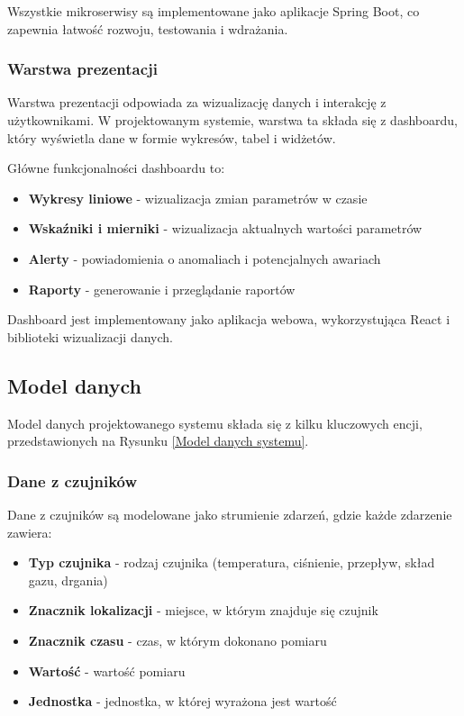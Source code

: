 Wszystkie mikroserwisy są implementowane jako aplikacje Spring Boot, co zapewnia łatwość rozwoju, testowania i wdrażania.

\subsubsection{Warstwa prezentacji}
\label{subsubsec:warstwa_prezentacji}

Warstwa prezentacji odpowiada za wizualizację danych i interakcję z użytkownikami.
W projektowanym systemie, warstwa ta składa się z dashboardu, który wyświetla dane w formie wykresów, tabel i widżetów.

Główne funkcjonalności dashboardu to:

\begin{itemize}
    \item \textbf{Wykresy liniowe} - wizualizacja zmian parametrów w czasie
    \item \textbf{Wskaźniki i mierniki} - wizualizacja aktualnych wartości parametrów
    \item \textbf{Alerty} - powiadomienia o anomaliach i potencjalnych awariach
    \item \textbf{Raporty} - generowanie i przeglądanie raportów
\end{itemize}

Dashboard jest implementowany jako aplikacja webowa, wykorzystująca React i biblioteki wizualizacji danych.

\subsection{Model danych}
\label{subsec:model_danych}

Model danych projektowanego systemu składa się z kilku kluczowych encji, przedstawionych na Rysunku \ref{Model danych systemu}.


\subsubsection{Dane z czujników}
\label{subsubsec:dane_czujnikow}

Dane z czujników są modelowane jako strumienie zdarzeń, gdzie każde zdarzenie zawiera:

\begin{itemize}
    \item \textbf{Typ czujnika} - rodzaj czujnika (temperatura, ciśnienie, przepływ, skład gazu, drgania)
    \item \textbf{Znacznik lokalizacji} - miejsce, w którym znajduje się czujnik
    \item \textbf{Znacznik czasu} - czas, w którym dokonano pomiaru
    \item \textbf{Wartość} - wartość pomiaru
    \item \textbf{Jednostka} - jednostka, w której wyrażona jest wartość
\end{itemize}

